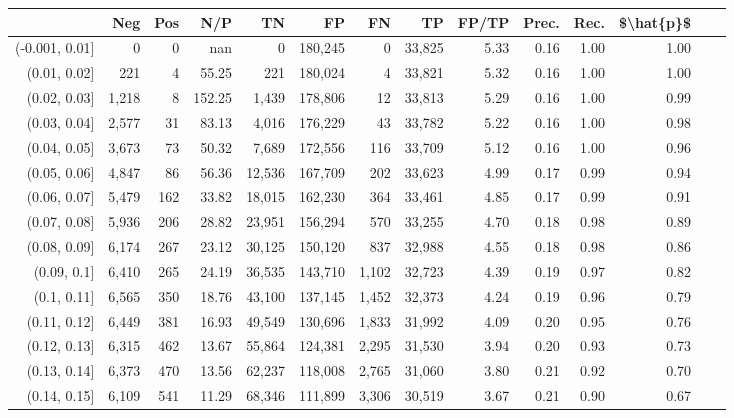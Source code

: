 \begin{tabular}{rrrrrrrrrrrrrr}
\toprule
{} &    Neg &  Pos &     N/P &       TN &       FP &      FN &      TP & FP/TP & Prec. &  Rec. & \$\textbackslash hat\{p\}\$ \\
\midrule
(-0.001, 0.01] &      0 &    0 &     nan &        0 &  180,245 &       0 &  33,825 &  5.33 &  0.16 &  1.00 &      1.00 \\
(0.01, 0.02]   &    221 &    4 &   55.25 &      221 &  180,024 &       4 &  33,821 &  5.32 &  0.16 &  1.00 &      1.00 \\
(0.02, 0.03]   &  1,218 &    8 &  152.25 &    1,439 &  178,806 &      12 &  33,813 &  5.29 &  0.16 &  1.00 &      0.99 \\
(0.03, 0.04]   &  2,577 &   31 &   83.13 &    4,016 &  176,229 &      43 &  33,782 &  5.22 &  0.16 &  1.00 &      0.98 \\
(0.04, 0.05]   &  3,673 &   73 &   50.32 &    7,689 &  172,556 &     116 &  33,709 &  5.12 &  0.16 &  1.00 &      0.96 \\
(0.05, 0.06]   &  4,847 &   86 &   56.36 &   12,536 &  167,709 &     202 &  33,623 &  4.99 &  0.17 &  0.99 &      0.94 \\
(0.06, 0.07]   &  5,479 &  162 &   33.82 &   18,015 &  162,230 &     364 &  33,461 &  4.85 &  0.17 &  0.99 &      0.91 \\
(0.07, 0.08]   &  5,936 &  206 &   28.82 &   23,951 &  156,294 &     570 &  33,255 &  4.70 &  0.18 &  0.98 &      0.89 \\
(0.08, 0.09]   &  6,174 &  267 &   23.12 &   30,125 &  150,120 &     837 &  32,988 &  4.55 &  0.18 &  0.98 &      0.86 \\
(0.09, 0.1]    &  6,410 &  265 &   24.19 &   36,535 &  143,710 &   1,102 &  32,723 &  4.39 &  0.19 &  0.97 &      0.82 \\
(0.1, 0.11]    &  6,565 &  350 &   18.76 &   43,100 &  137,145 &   1,452 &  32,373 &  4.24 &  0.19 &  0.96 &      0.79 \\
(0.11, 0.12]   &  6,449 &  381 &   16.93 &   49,549 &  130,696 &   1,833 &  31,992 &  4.09 &  0.20 &  0.95 &      0.76 \\
(0.12, 0.13]   &  6,315 &  462 &   13.67 &   55,864 &  124,381 &   2,295 &  31,530 &  3.94 &  0.20 &  0.93 &      0.73 \\
(0.13, 0.14]   &  6,373 &  470 &   13.56 &   62,237 &  118,008 &   2,765 &  31,060 &  3.80 &  0.21 &  0.92 &      0.70 \\
(0.14, 0.15]   &  6,109 &  541 &   11.29 &   68,346 &  111,899 &   3,306 &  30,519 &  3.67 &  0.21 &  0.90 &      0.67 \\

\end{tabular}
